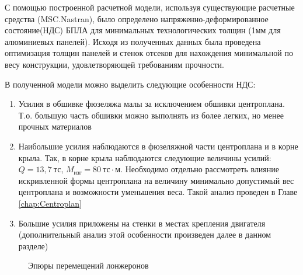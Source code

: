 
С помощью построенной расчетной модели, используя существующие расчетные средства (MSC.Nastran), было определено напряженно-деформированное состояние(НДС) БПЛА для минимальных технологических толщин (1мм для алюминиевых панелей). Исходя из полученных данных была проведена оптимизация толщин панелей и стенок отсеков для нахождения минимальной по весу конструкции, удовлетворяющей требованиям прочности.

В полученной модели можно выделить следующие особенности НДС:

\begin{enumerate}
\item Усилия в обшивке фюзеляжа малы за исключением обшивки центроплана. Т.о. большую часть обшивки можно выполнять из более легких, но менее прочных материалов
\item Наибольшие усилия наблюдаются в фюзеляжной части центроплана и в корне крыла. Так, в корне крыла наблюдаются следующие величины усилий: $Q = 13,7~\text{тс}$, $M_\text{изг} = 80~\text{тс}\cdot\text{м}$. Необходимо отдельно рассмотреть влияние искривленной формы центроплана на величину минимально допустимый вес центроплана и возможности уменьшения веса. Такой анализ проведен в Главе \ref{chap:Centroplan}
\item Большие усилия приложены на стенки в местах крепления двигателя (дополнительный анализ этой особенности произведен далее в данном разделе)
\end{enumerate}  


%



\begin{figure}[H]
\centering
\def\svgwidth{0.9\textwidth}

\caption{Эпюры перемещений лонжеронов}
\label{fig:WingDeformation3}
\end{figure}


%
